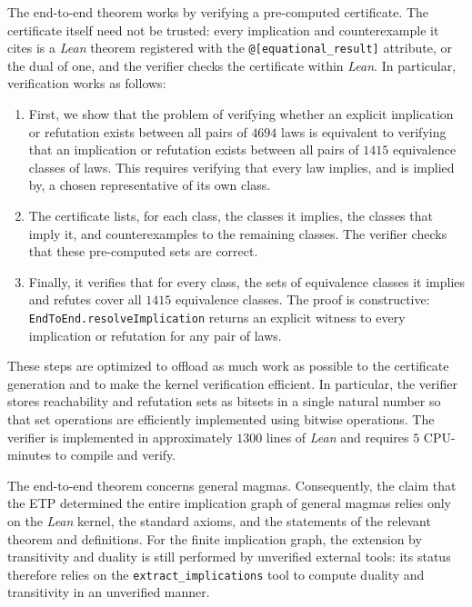 The end-to-end theorem works by verifying a pre-computed certificate.  The certificate itself need not be trusted: every implication and counterexample it cites is a \emph{Lean} theorem registered with the \texttt{@{[}equational\_result{]}} attribute, or the dual of one, and the verifier checks the certificate within \emph{Lean}.  In particular, verification works as follows:
\begin{enumerate}
\item First, we show that the problem of verifying whether an explicit implication or refutation exists between all pairs of $\num{4694}$ laws is equivalent to verifying that an implication or refutation exists between all pairs of $\num{1415}$ equivalence classes of laws.  This requires verifying that every law implies, and is implied by, a chosen representative of its own class.
\item The certificate lists, for each class, the classes it implies, the classes that imply it, and counterexamples to the remaining classes.  The verifier checks that these pre-computed sets are correct.
\item Finally, it verifies that for every class, the sets of equivalence classes it implies and refutes cover all $\num{1415}$ equivalence classes.  The proof is constructive: \texttt{EndToEnd.resolveImplication} returns an explicit witness to every implication or refutation for any pair of laws.
\end{enumerate}

These steps are optimized to offload as much work as possible to the certificate generation and to make the kernel verification efficient.  In particular, the verifier stores reachability and refutation sets as bitsets in a single natural number so that set operations are efficiently implemented using bitwise operations.  The verifier is implemented in approximately $1300$ lines of \emph{Lean} and requires $5$ CPU-minutes to compile and verify.

The end-to-end theorem concerns general magmas. Consequently, the claim that the ETP determined the entire implication graph of general magmas relies only on the \emph{Lean} kernel, the standard axioms, and the statements of the relevant theorem and definitions.  For the finite implication graph, the extension by transitivity and duality is still performed by unverified external tools: its status therefore relies on the \texttt{extract\_implications} tool to compute duality and transitivity in an unverified manner.

